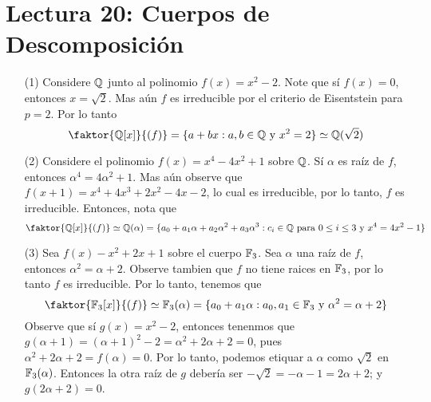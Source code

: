 \section*{Lectura 20: Cuerpos de Descomposici\'on}

\begin{example}\label{}
    \begin{enumerate}
        \item[(1)] Considere $\mathbb{Q}$ junto al polinomio $f(x)=x^2-2$. Note que s\'i
            $f(x)=0$, entonces $x=\sqrt{2}$. Mas a\'un $f$ es irreducible por el
            criterio de Eisentstein para  $p=2$. Por lo tanto
            \begin{equation*}
                \faktor{\Q[x]}{(f)}=\{a+bx : a,b \in \Q \text{ y } x^2=2\} \simeq
                \Q(\sqrt{2})
            \end{equation*}

        \item[(2)] Considere el polinomio $f(x)=x^4-4x^2+1$ sobre $\mathbb{Q}$. S\'i
            $\alpha$ es ra\'iz de $f$, entonces $\alpha^4=4\alpha^2+1$. Mas
            a\'un observe que  $f(x+1)=x^4+4x^3+2x^2-4x-2$, lo cual es
            irreducible, por lo tanto, $f$ es irreducible. Entonces, nota que
            \begin{equation*}
                \faktor{\Q[x]}{(f)} \simeq \Q(\alpha)=
                \{a_0+a_1\alpha+a_2\alpha^2+a_3\alpha^3 : c_i \in \Q \text{ para }
                0 \leq i \leq 3 \text{ y } x^4=4x^2-1\}
            \end{equation*}

        \item[(3)] Sea $f(x)-x^2+2x+1$ sobre el cuerpo $\mathbb{F}_3$. Sea  $\alpha$ una
            ra\'iz de  $f$, entonces  $\alpha^2=\alpha+2$. Observe tambien que
             $f$ no tiene raices en $\mathbb{F}_3$, por lo tanto $f$ es irreducible. Por
              lo tanto, tenemos que
              \begin{equation*}
                  \faktor{\F_3[x]}{(f)} \simeq \F_3(\alpha)=
                  \{a_0+a_1\alpha : a_0,a_1 \in \F_3 \text{ y }
                  \alpha^2=\alpha+2\}
              \end{equation*}
              Observe que s\'i $g(x)=x^2-2$, entonces tenenmos que
              $g(\alpha+1)=(\alpha+1)^2-2=\alpha^2+2\alpha+2=0$, pues
              $\alpha^2+2\alpha+2=f(\alpha)=0$. Por lo tanto, podemos etiquar a
              $\alpha$ como  $\sqrt{2}$ en $\mathbb{F}_3(\alpha)$. Entonces la otra
              ra\'iz de $g$ deber\'ia ser  $-\sqrt{2}=-\alpha-1=2\alpha+2$; y
              $g(2\alpha+2)=0$.
    \end{enumerate}
\end{example}

